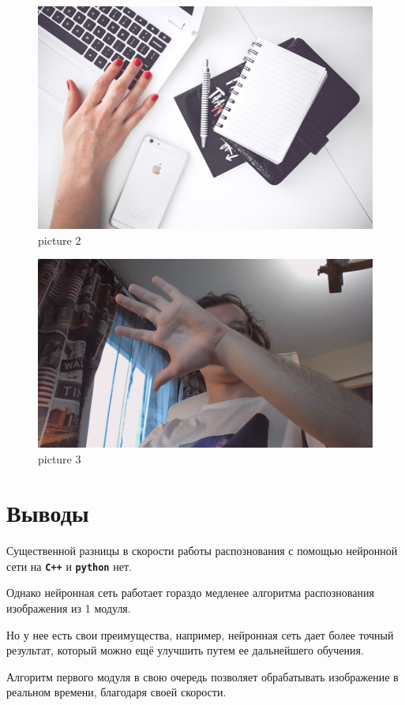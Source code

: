 \documentclass[
  12pt,
  a4paper,
]{article}
\begin{document}
\begin{figure}
\centering
\includegraphics{../hw2/HandPose/hand.jpg}
\caption{picture 2}
\end{figure}

\begin{figure}
\centering
\includegraphics{../hw2/HandPose/myhand.jpg}
\caption{picture 3}
\end{figure}

\hypertarget{ux432ux44bux432ux43eux434ux44b}{%
\section{Выводы}\label{ux432ux44bux432ux43eux434ux44b}}

Существенной разницы в скорости работы распознования с помощью нейронной
сети на \textbf{\texttt{C++}} и \textbf{\texttt{python}} нет.

Однако нейронная сеть работает гораздо медленее алгоритма распознования
изображения из 1 модуля.

Но у нее есть свои преимущества, например, нейронная сеть дает более
точный результат, который можно ещё улучшить путем ее дальнейшего
обучения.

Алгоритм первого модуля в свою очередь позволяет обрабатывать
изображение в реальном времени, благодаря своей скорости.
\end{document}
